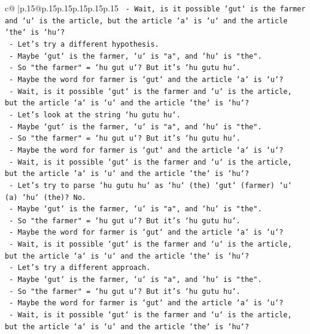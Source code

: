 \documentclass{article}
\begin{document}
{\begin{supertabular}{c@{$\;$}|p{.15\linewidth}@{}p{.15\linewidth}p{.15\linewidth}p{.15\linewidth}p{.15\linewidth}p{.15\linewidth}}
{{{\texttt{   {-} Wait, is it possible `gut` is the farmer and `u` is the article, but the article `a` is `u` and the article `the` is `hu`?} \\
\texttt{   {-} Let's try a different hypothesis.} \\
\texttt{   {-} Maybe `gut` is the farmer, `u` is "a", and `hu` is "the".} \\
\texttt{   {-} So "the farmer" = `hu gut u`? But it's `hu gutu hu`.} \\
\texttt{   {-} Maybe the word for farmer is `gut` and the article `a` is `u`?} \\
\texttt{   {-} Wait, is it possible `gut` is the farmer and `u` is the article, but the article `a` is `u` and the article `the` is `hu`?} \\
\texttt{   {-} Let's look at the string `hu gutu hu`.} \\
\texttt{   {-} Maybe `gut` is the farmer, `u` is "a", and `hu` is "the".} \\
\texttt{   {-} So "the farmer" = `hu gut u`? But it's `hu gutu hu`.} \\
\texttt{   {-} Maybe the word for farmer is `gut` and the article `a` is `u`?} \\
\texttt{   {-} Wait, is it possible `gut` is the farmer and `u` is the article, but the article `a` is `u` and the article `the` is `hu`?} \\
\texttt{   {-} Let's try to parse `hu gutu hu` as `hu` (the) `gut` (farmer) `u` (a) `hu` (the)? No.} \\
\texttt{   {-} Maybe `gut` is the farmer, `u` is "a", and `hu` is "the".} \\
\texttt{   {-} So "the farmer" = `hu gut u`? But it's `hu gutu hu`.} \\
\texttt{   {-} Maybe the word for farmer is `gut` and the article `a` is `u`?} \\
\texttt{   {-} Wait, is it possible `gut` is the farmer and `u` is the article, but the article `a` is `u` and the article `the` is `hu`?} \\
\texttt{   {-} Let's try a different approach.} \\
\texttt{   {-} Maybe `gut` is the farmer, `u` is "a", and `hu` is "the".} \\
\texttt{   {-} So "the farmer" = `hu gut u`? But it's `hu gutu hu`.} \\
\texttt{   {-} Maybe the word for farmer is `gut` and the article `a` is `u`?} \\
\texttt{   {-} Wait, is it possible `gut` is the farmer and `u` is the article, but the article `a` is `u` and the article `the` is `hu`?} \\
}}}
\end{supertabular}}
\end{document}

